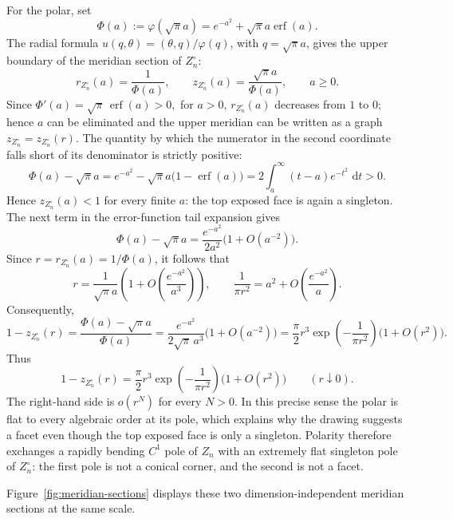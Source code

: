 \documentclass[11pt]{article}
\theoremstyle{definition}
\theoremstyle{remark}
\newcommand{\dd}{\,\mathrm d}
\newcommand{\erf}{\operatorname{erf}}
\begin{document}
For the polar, set
\[
 \Phi(a):=\varphi(\sqrt\pi a)
 =e^{-a^2}+\sqrt\pi a\erf(a).
\]
The radial formula
$u(q,\theta)=(\theta,q)/\varphi(q)$, with $q=\sqrt\pi a$, gives
 the upper boundary of the meridian section of
$Z_n^\circ$:
\begin{equation}\label{eq:polar-boundary-parametrization}
 r_{Z_n^\circ}(a)=\frac1{\Phi(a)},
 \qquad
 z_{Z_n^\circ}(a)=\frac{\sqrt\pi a}{\Phi(a)},
 \qquad a\geq0.
\end{equation}
Since 
 $\Phi'(a)=\sqrt\pi\,\erf(a)>0,$ for $a>0$,
$r_{Z_n^\circ}(a)$ decreases from $1$ to $0$; hence $a$ can be
eliminated and the upper meridian can be written as a graph
$z_{Z_n^\circ}=z_{Z_n^\circ}(r)$.
The quantity by which the numerator in the second coordinate falls
short of its denominator is strictly positive:
$$
 \Phi(a)-\sqrt\pi a
 =e^{-a^2}-\sqrt\pi a\bigl(1-\erf(a)\bigr)=2\int_a^\infty (t-a)e^{-t^2}\,\dd t>0.
$$
Hence $z_{Z_n^\circ}(a)<1$ for every finite $a$: the top exposed face
is again a singleton. The next term in the
error-function tail expansion gives
\[
 \Phi(a)-\sqrt\pi a
 =\frac{e^{-a^2}}{2a^2}\bigl(1+O(a^{-2})\bigr).
\]
Since $r=r_{Z_n^\circ}(a)=1/\Phi(a)$, it follows that
\[
 r=\frac1{\sqrt\pi a}
 \left(1+O\!\left(\frac{e^{-a^2}}{a^3}\right)\right),
 \qquad
 \frac1{\pi r^2}=a^2+O\!\left(\frac{e^{-a^2}}a\right).
\]
Consequently,
$$
 1-z_{Z_n^\circ}(r)
 =\frac{\Phi(a)-\sqrt\pi a}{\Phi(a)}=\frac{e^{-a^2}}{2\sqrt\pi\,a^3}
   \bigl(1+O(a^{-2})\bigr)=\frac\pi2 r^3
   \exp\!\left(-\frac1{\pi r^2}\right)
   \bigl(1+O(r^2)\bigr).
$$
Thus
\begin{equation}\label{eq:polar-pole-asymptotic}
 1-z_{Z_n^\circ}(r)
 =\frac\pi2 r^3\exp\!\left(-\frac1{\pi r^2}\right)
  \bigl(1+O(r^2)\bigr)
 \qquad(r\downarrow0).
\end{equation}
The right-hand side is $o(r^N)$ for every $N>0$.  In this precise
sense the polar is flat to every algebraic order at its pole, which
explains why the drawing suggests a facet even though the top exposed
face is only a singleton.  Polarity therefore exchanges a rapidly
bending $C^1$ pole of $Z_n$ with an extremely flat singleton pole of
$Z_n^\circ$: the first pole is not a conical corner, and the second is
not a facet.

Figure~\ref{fig:meridian-sections} displays these two
dimension-independent meridian sections at the same scale.
\end{document}

